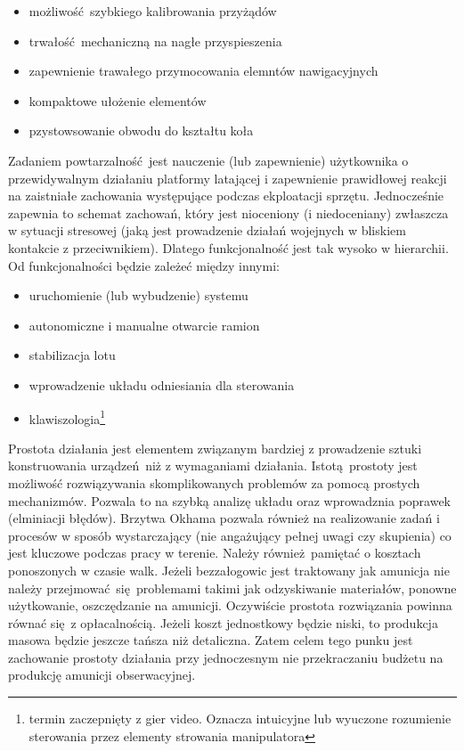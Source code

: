 \begin{itemize}
  \item możliwość szybkiego kalibrowania przyżądów
  \item trwałość mechaniczną na nagłe przyspieszenia
  \item zapewnienie trawałego przymocowania elemntów nawigacyjnych
  \item kompaktowe ułożenie elementów
  \item pzystowsowanie obwodu do kształtu koła
\end{itemize}

Zadaniem powtarzalność jest nauczenie (lub zapewnienie) użytkownika o przewidywalnym działaniu platformy latającej i zapewnienie prawidłowej reakcji na zaistniałe zachowania występujące podczas ekploatacji sprzętu. Jednocześnie zapewnia to schemat zachowań, który jest nioceniony (i niedoceniany) zwłaszcza w sytuacji stresowej (jaką jest prowadzenie działań wojejnych w bliskiem kontakcie z przeciwnikiem). Dlatego funkcjonalność jest tak wysoko w hierarchii. Od funkcjonalności będzie zależeć między innymi:

\begin{itemize}
  \item uruchomienie (lub wybudzenie) systemu
  \item autonomiczne i manualne otwarcie ramion
  \item stabilizacja lotu
  \item wprowadzenie układu odniesiania dla sterowania
  \item klawiszologia\footnote{termin zaczepnięty z gier video. Oznacza intuicyjne lub wyuczone rozumienie sterowania przez elementy strowania manipulatora}
\end{itemize}

Prostota działania jest elementem związanym bardziej z prowadzenie sztuki konstruowania urządzeń niż z wymaganiami działania. Istotą prostoty jest możliwość rozwiązywania skomplikowanych problemów za pomocą prostych mechanizmów. Pozwala to na szybką analizę układu oraz wprowadznia poprawek (elminiacji błędów). Brzytwa Okhama pozwala również na realizowanie zadań i procesów w sposób wystarczający (nie angażujący pełnej uwagi czy skupienia) co jest kluczowe podczas pracy w terenie. Należy również pamiętać o kosztach ponoszonych w czasie walk. Jeżeli bezzałogowic jest traktowany jak amunicja nie należy przejmować się problemami takimi jak odzyskiwanie materiałów, ponowne użytkowanie, oszczędzanie na amunicji. Oczywiście prostota rozwiązania powinna równać się z opłacalnością. Jeżeli koszt jednostkowy będzie niski, to produkcja masowa będzie jeszcze tańsza niż detaliczna. Zatem celem tego punku jest zachowanie prostoty działania przy jednoczesnym nie przekraczaniu budżetu na produkcję amunicji obserwacyjnej.

